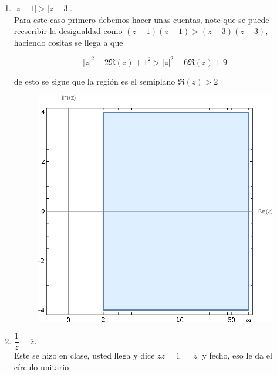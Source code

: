 \documentclass[11pt]{article}
\begin{document}
\begin{enumerate}
\begin{enumerate}
        \item $|z - 1| > |z - 3|$.\\

        Para este caso primero debemos hacer unas cuentas, note que se puede reescribir la desigualdad como $(z-1)(z-1)>(z-3)(z-3)$, haciendo cositas se llega a que

        $$|z|^2-2 \Re(z)+1^2>|z|^2-6 \Re(z)+9 $$

        de esto se sigue que la región es el semiplano $\Re(z)>2$

         \begin{figure}[H]
         \centering
         \includegraphics[scale=0.8]{R2.eps}
         \end{figure} 

        \item $\dfrac{1}{z} = \overline{z}$.\\

        Este se hizo en clase, usted llega y dice $z \overline{z}=1=|z|$ y fecho, eso le da el círculo unitario\\


\end{enumerate}
\end{enumerate}
\end{document}
